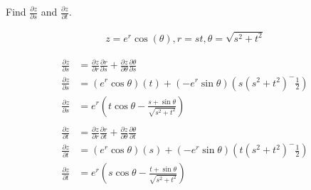 Find $\frac{\partial z}{\partial s}$ and $\frac{\partial z}{\partial t}$.

\begin{align*}
    z = e^r \cos(\theta), r = st, \theta = \sqrt{s^2 + t^2}
\end{align*}

\begin{solution}
\begin{align*}
    \frac{\partial z}{\partial s} &= \frac{\partial z}{\partial r} \frac{\partial r}{\partial s} +  \frac{\partial z}{\partial \theta} \frac{\partial \theta}{\partial s} \\
    \frac{\partial z}{\partial s} &= \left(e^r\cos\theta\right)(t) + \left(-e^r\sin\theta\right)\left(s\left(s^2+t^2\right)^-\frac{1}{2}\right) \\
    \frac{\partial z}{\partial s} &= e^r\left(t\cos\theta - \frac{s + \sin\theta}{\sqrt{s^2 + t^2}}\right) \\
    \\
    \frac{\partial z}{\partial t} &= \frac{\partial z}{\partial r} \frac{\partial r}{\partial t} +  \frac{\partial z}{\partial \theta} \frac{\partial \theta}{\partial t} \\
    \frac{\partial z}{\partial t} &= \left(e^r\cos\theta\right)(s) + \left(-e^r\sin\theta\right)\left(t\left(s^2+t^2\right)^-\frac{1}{2}\right) \\
    \frac{\partial z}{\partial t} &= e^r\left(s\cos\theta - \frac{t + \sin\theta}{\sqrt{s^2 + t^2}}\right) \\
\end{align*}
\end{solution}
